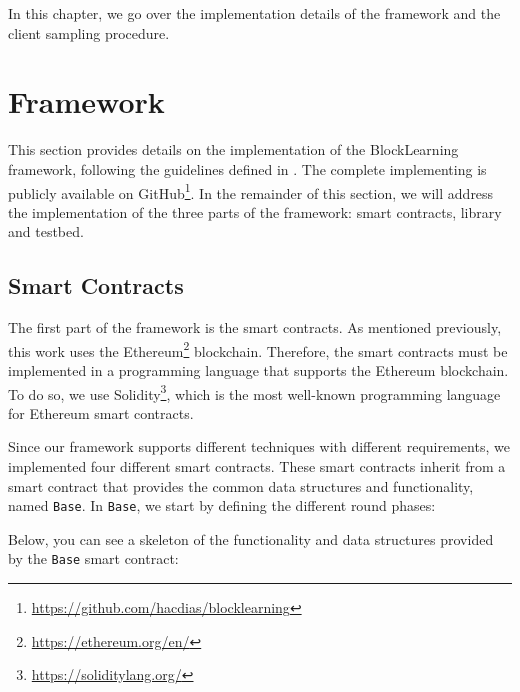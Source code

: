 In this chapter, we go over the implementation details of the framework and the client sampling procedure.

\section{Framework}

This section provides details on the implementation of the BlockLearning framework, following the guidelines defined in . The complete implementing is publicly available on GitHub\footnote{\url{https://github.com/hacdias/blocklearning}}. In the remainder of this section, we will address the implementation of the three parts of the framework: smart contracts, library and testbed.

\subsection{Smart Contracts}

The first part of the framework is the smart contracts. As mentioned previously, this work uses the Ethereum\footnote{\url{https://ethereum.org/en/}} blockchain. Therefore, the smart contracts must be implemented in a programming language that supports the Ethereum blockchain. To do so, we use Solidity\footnote{\url{https://soliditylang.org/}}, which is the most well-known programming language for Ethereum smart contracts.

Since our framework supports different techniques with different requirements, we implemented four different smart contracts. These smart contracts inherit from a smart contract that provides the common data structures and functionality, named \texttt{Base}. In \texttt{Base}, we start by defining the different round phases:




Below, you can see a skeleton of the functionality and data structures provided by the \texttt{Base} smart contract:

    
